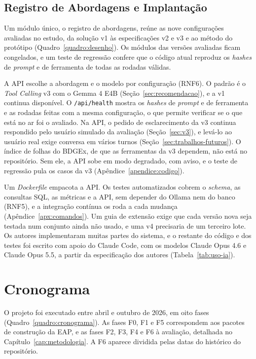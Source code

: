 \subsection{Registro de Abordagens e Implantação}
\label{sec:harness}

Um módulo único, o registro de abordagens, reúne as nove configurações avaliadas no estudo, da solução v1 às especificações v2 e v3 e ao método do protótipo (Quadro~\ref{quadro:desenho}). Os módulos das versões avaliadas ficam congelados, e um teste de regressão confere que o código atual reproduz os \textit{hashes} de \textit{prompt} e de ferramenta de todas as rodadas válidas.

A API escolhe a abordagem e o modelo por configuração (RNF6). O padrão é o \textit{Tool Calling} v3 com o Gemma 4 E4B (Seção~\ref{sec:recomendacao}), e a v1 continua disponível. O \texttt{/api/health} mostra os \textit{hashes} de \textit{prompt} e de ferramenta e as rodadas feitas com a mesma configuração, o que permite verificar se o que está no ar foi o avaliado. Na API, o pedido de esclarecimento da v3 continua respondido pelo usuário simulado da avaliação (Seção~\ref{sec:v3}), e levá-lo ao usuário real exige conversa em vários turnos (Seção~\ref{sec:trabalhos-futuros}). O índice de folhas do BDGEx, de que as ferramentas da v3 dependem, não está no repositório. Sem ele, a API sobe em modo degradado, com aviso, e o teste de regressão pula os casos da v3 (Apêndice~\ref{apendice:codigo}).

Um \textit{Dockerfile} empacota a API. Os testes automatizados cobrem o \textit{schema}, as consultas SQL, as métricas e a API, sem depender do Ollama nem do banco (RNF5), e a integração contínua os roda a cada mudança (Apêndice~\ref{apx:comandos}). Um guia de extensão exige que cada versão nova seja testada num conjunto ainda não usado, e uma v4 precisaria de um terceiro lote. Os autores implementaram muitas partes do sistema, e o restante do código e dos testes foi escrito com apoio do Claude Code, com os modelos Claude Opus 4.6 e Claude Opus 5.5, a partir da especificação dos autores (Tabela~\ref{tab:uso-ia}).

\section{Cronograma}
\label{sec:cronograma}

O projeto foi executado entre abril e outubro de 2026, em oito fases (Quadro~\ref{quadro:cronograma}). As fases F0, F1 e F5 correspondem aos pacotes de construção da EAP, e as fases F2, F3, F4 e F6 à avaliação, detalhada no Capítulo~\ref{cap:metodologia}. A F6 aparece dividida pelas datas do histórico do repositório.

